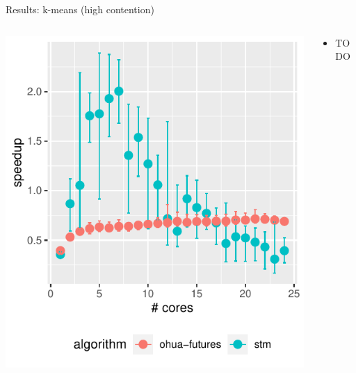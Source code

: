 \documentclass[aspectratio=169, usenames, dvipsnames]{beamer}
\begin{document}
\begin{frame}{Results: k-means (high contention)}
    \begin{columns}%
        \begin{column}{0.5\textwidth}
            \centering
            \includegraphics[width=\textwidth,height=.65\textheight,keepaspectratio]{img/results/kmeans-high++}
        \end{column}%
        \begin{column}{0.5\textwidth}
            \begin{itemize}
                \item TODO
            \end{itemize}
        \end{column}
    \end{columns}
\end{frame}
\end{document}
